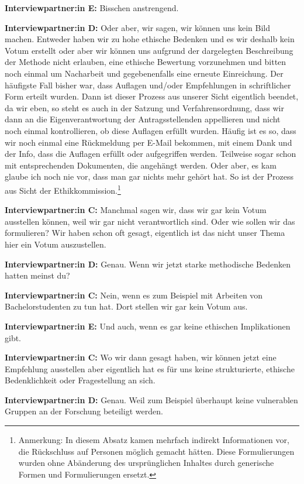 \documentclass[a4paper,12pt,twoside]{scrreprt}
\begin{document}
\textbf{Interviewpartner:in E:} Bisschen anstrengend.

\textbf{Interviewpartner:in D:} Oder aber, wir sagen, wir können uns kein Bild machen. Entweder haben wir zu hohe ethische Bedenken und es wir deshalb kein Votum erstellt oder aber wir können uns aufgrund der dargelegten Beschreibung der Methode nicht erlauben, eine ethische Bewertung vorzunehmen und bitten noch einmal um Nacharbeit und gegebenenfalls eine erneute Einreichung. Der häufigste Fall bisher war, dass Auflagen und/oder Empfehlungen in schriftlicher Form erteilt wurden. Dann ist dieser Prozess aus unserer Sicht eigentlich beendet, da wir eben, so steht es auch in der Satzung und Verfahrensordnung, dass wir dann an die Eigenverantwortung der Antragsstellenden appellieren und nicht noch einmal kontrollieren, ob diese Auflagen erfüllt wurden. Häufig ist es so, dass wir noch einmal eine Rückmeldung per E-Mail bekommen, mit einem Dank und der Info, dass die Auflagen erfüllt oder aufgegriffen werden. Teilweise sogar schon mit entsprechenden Dokumenten, die angehängt werden. Oder aber, es kam glaube ich noch nie vor, dass man gar nichts mehr gehört hat. So ist der Prozess aus Sicht der Ethikkommission.\footnote{Anmerkung: In diesem Absatz kamen mehrfach indirekt Informationen vor, die Rückschluss auf Personen möglich gemacht hätten. Diese Formulierungen wurden ohne Abänderung des ursprünglichen Inhaltes durch generische Formen und Formulierungen ersetzt.}

\textbf{Interviewpartner:in C:} Manchmal sagen wir, dass wir gar kein Votum ausstellen können, weil wir gar nicht verantwortlich sind. Oder wie sollen wir das formulieren? Wir haben schon oft gesagt, eigentlich ist das nicht unser Thema hier ein Votum auszustellen.

\textbf{Interviewpartner:in D:} Genau. Wenn wir jetzt starke methodische Bedenken hatten meinst du?

\textbf{Interviewpartner:in C:} Nein, wenn es zum Beispiel mit Arbeiten von Bachelorstudenten zu tun hat. Dort stellen wir gar kein Votum aus.

\textbf{Interviewpartner:in E:} Und auch, wenn es gar keine ethischen Implikationen gibt.

\textbf{Interviewpartner:in C:} Wo wir dann gesagt haben, wir können jetzt eine Empfehlung ausstellen aber eigentlich hat es für uns keine strukturierte, ethische Bedenklichkeit oder Fragestellung an sich.

\textbf{Interviewpartner:in D:} Genau. Weil zum Beispiel überhaupt keine vulnerablen Gruppen an der Forschung beteiligt werden.
\end{document}
